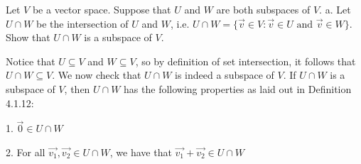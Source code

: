 \documentclass[12pt]{article}
\newenvironment{problem}[2][Problem]
{
	\begin{trivlist} 
		\item[\hskip \labelsep {\bfseries #1 #2:}]
	}
{
	\end{trivlist}
	}
\newenvironment{solution}[1][Solution]
{
	\begin{trivlist} 
		\item[\hskip \labelsep {\itshape #1:}]
	}
	{
	\end{trivlist}
}
\begin{document}
\newpage
\begin{problem}{2}
Let $V$ be a vector space. Suppose that $U$ and $W$ are both subspaces of $V$.
\noindent
\newline
\newline
a. Let $U \cap W$ be the intersection of $U$ and $W$, i.e. $U \cap W = \{\vec{v} \in V: \vec{v}\in U \text{ and } \vec{v}\in W\}$. Show that $U\cap W$ is a subspace of $V$.
\begin{solution}
Notice that $U \subseteq V$ and $W \subseteq V$, so by definition of set intersection, it follows that $U\cap W \subseteq V$.
We now check that $U\cap W$ is indeed a subspace of $V$. If $U\cap W$ is a subspace of $V$, then $U\cap W$ has the following properties as laid out in Definition 4.1.12:

1. $\vec{0} \in U \cap W$

2. For all $\vec{v_1},\vec{v_2} \in U\cap W$, we have that $\vec{v_1}+\vec{v_2} \in U \cap W$


\end{solution}
\end{problem}
\end{document}

